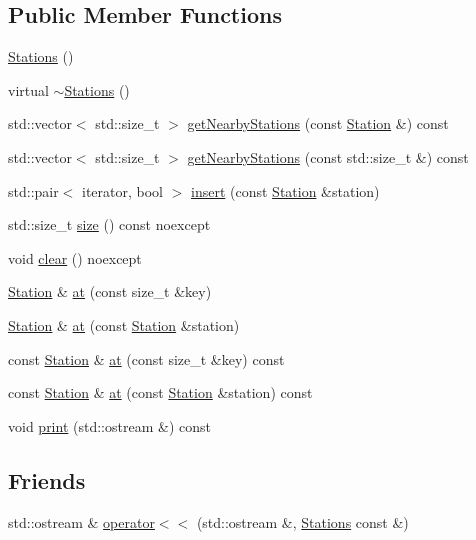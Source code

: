 \subsection*{Public Member Functions}
\begin{DoxyCompactItemize}
\item 
\mbox{\hyperlink{class_stations_a4e0f8fc4709bd680154b7be896ca2350}{Stations}} ()
\item 
virtual \mbox{\hyperlink{class_stations_a9d17c76f77babd7e88adf95112825b1d}{$\sim$\+Stations}} ()
\item 
std\+::vector$<$ std\+::size\+\_\+t $>$ \mbox{\hyperlink{class_stations_ac0438c6c8639d209dfc3937cfd993723}{get\+Nearby\+Stations}} (const \mbox{\hyperlink{class_station}{Station}} \&) const
\item 
std\+::vector$<$ std\+::size\+\_\+t $>$ \mbox{\hyperlink{class_stations_afebcca23df46c02b2d4dfe53da2f03d1}{get\+Nearby\+Stations}} (const std\+::size\+\_\+t \&) const
\item 
std\+::pair$<$ iterator, bool $>$ \mbox{\hyperlink{class_stations_abe1318af7b69c4eb586b099af6a1f6b8}{insert}} (const \mbox{\hyperlink{class_station}{Station}} \&station)
\item 
std\+::size\+\_\+t \mbox{\hyperlink{class_stations_a5ace2f695d182f4fa0645f826f6662a7}{size}} () const noexcept
\item 
void \mbox{\hyperlink{class_stations_a4d69d6bf3e2504d3baccd53a7bd89888}{clear}} () noexcept
\item 
\mbox{\hyperlink{class_station}{Station}} \& \mbox{\hyperlink{class_stations_a1d2abb378db9aa8deb9f7b54aefac2dd}{at}} (const size\+\_\+t \&key)
\item 
\mbox{\hyperlink{class_station}{Station}} \& \mbox{\hyperlink{class_stations_a0db00fc62fdeebde93f2624477074087}{at}} (const \mbox{\hyperlink{class_station}{Station}} \&station)
\item 
const \mbox{\hyperlink{class_station}{Station}} \& \mbox{\hyperlink{class_stations_ab785e4995153a682ac3fd739b99e8db3}{at}} (const size\+\_\+t \&key) const
\item 
const \mbox{\hyperlink{class_station}{Station}} \& \mbox{\hyperlink{class_stations_a76175b88bafb7de42fae0a5d7518aac9}{at}} (const \mbox{\hyperlink{class_station}{Station}} \&station) const
\item 
void \mbox{\hyperlink{class_stations_ae62b158dedf5f15c385671d15b950dc5}{print}} (std\+::ostream \&) const
\end{DoxyCompactItemize}
\subsection*{Friends}
\begin{DoxyCompactItemize}
\item 
std\+::ostream \& \mbox{\hyperlink{class_stations_a6c2ba44849c083fa6d206d4573ea523e}{operator$<$$<$}} (std\+::ostream \&, \mbox{\hyperlink{class_stations}{Stations}} const \&)
\end{DoxyCompactItemize}



